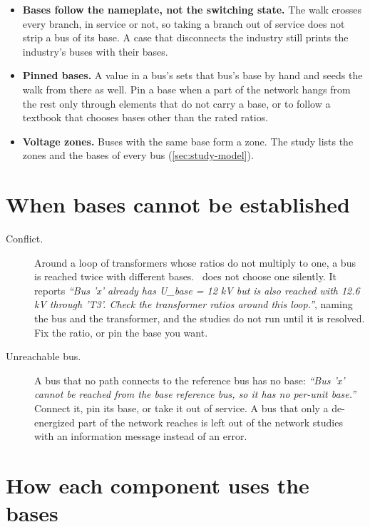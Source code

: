 \begin{itemize}
  \item \textbf{Bases follow the nameplate, not the switching state.} The walk crosses
    every branch, in service or not, so taking a branch out of service does not strip a
    bus of its base. A case that disconnects the industry still prints the industry's
    buses with their bases.
  \item \textbf{Pinned bases.} A value in a bus's  sets that bus's base
    by hand and seeds the walk from there as well. Pin a base when a part of the network
    hangs from the rest only through elements that do not carry a base, or to follow a
    textbook that chooses bases other than the rated ratios.
  \item \textbf{Voltage zones.} Buses with the same base form a zone. The
     study lists the zones and the bases of every bus
    (\cref{sec:study-model}).
\end{itemize}

\section{When bases cannot be established}

\begin{description}
  \item[Conflict.] Around a loop of transformers whose ratios do not multiply to one, a
    bus is reached twice with different bases. \app\ does not choose one silently. It
    reports \emph{``Bus 'x' already has U\_base = 12 kV but is also reached with 12.6 kV
    through 'T3'. Check the transformer ratios around this loop.''}, naming the bus and the
    transformer, and the studies do not run until it is resolved. Fix the ratio, or pin
    the base you want.
  \item[Unreachable bus.] A bus that no path connects to the reference bus has no base:
    \emph{``Bus 'x' cannot be reached from the base reference bus, so it has no per-unit
    base.''} Connect it, pin its base, or take it out of service. A bus that only a
    de-energized part of the network reaches is left out of the network studies with an
    information message instead of an error.
\end{description}

\section{How each component uses the bases}

